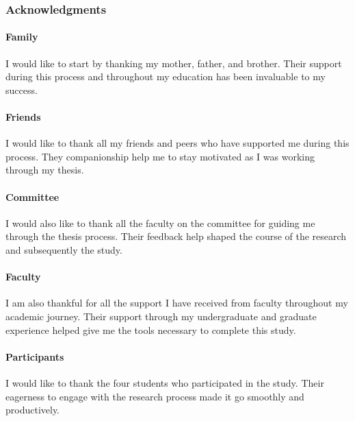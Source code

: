 \begin{center}
    \subsubsection*{Acknowledgments}
\end{center}


\paragraph{Family} I would like to start by thanking my mother, father, and brother. Their support during this process and throughout my education has been invaluable to my success.

\paragraph{Friends} I would like to thank all my friends and peers who have supported me during this process. They companionship help me to stay motivated as I was working through my thesis.

\paragraph{Committee} I would also like to thank all the faculty on the committee for guiding me through the thesis process. Their feedback help shaped the course of the research and subsequently the study.

\paragraph{Faculty} I am also thankful for all the support I have received from faculty throughout my academic journey. Their support through my undergraduate and graduate experience helped give me the tools necessary to complete this study.

\paragraph{Participants} I would like to thank the four students who participated in the study. Their eagerness to engage with the research process made it go smoothly and productively.